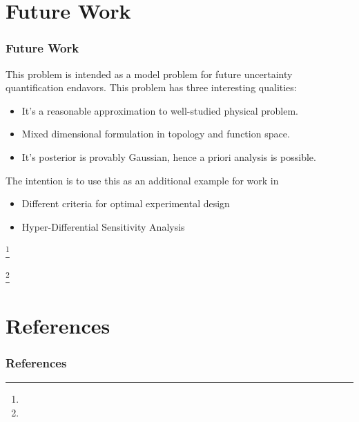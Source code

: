 \documentclass[
  pdf,
  10pt,
  xcolor={svgnames},
]{beamer}
\newcommand\blfootnote[1]{%
  \begingroup
  \renewcommand\thefootnote{}\footnote{#1}%
  \addtocounter{footnote}{-1}%
  \endgroup
}
\begin{document}
\section{Future Work}
\begin{frame}
  \frametitle{Future Work}
  This problem is intended as a model problem for future uncertainty
  quantification endavors. This problem has three interesting qualities:
  \begin{itemize}
    \item It's a reasonable approximation to well-studied physical problem.
    \item Mixed dimensional formulation in topology and function space.
    \item It's posterior is provably Gaussian, hence a priori analysis is
      possible.
  \end{itemize}
  The intention is to use this as an additional example for work in
  \begin{itemize}
    \item Different criteria for optimal experimental design
    \item Hyper-Differential Sensitivity Analysis
  \end{itemize}
  \blfootnote{}
  \blfootnote{}
\end{frame}


\section{References}
\begin{frame}[allowframebreaks]
  \frametitle{References}
  \printbibliography
\end{frame}
\end{document}
